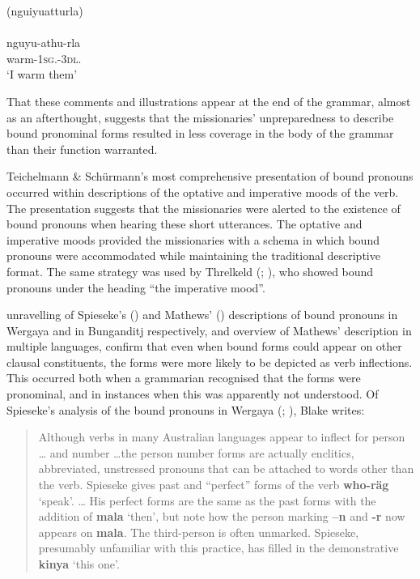 \ea\label{ex:5:18}
(nguiyuatturla)	\\
\citep[23]{teichelmann_outlines_1840} \\
\gll nguyu-athu-rla \\
warm-1\textsc{sg}.-3\textsc{dl}.                              \\
\glt `I warm them'
\z

That these comments and illustrations appear at the end of the grammar, almost as an afterthought, suggests that the missionaries' unpreparedness to describe bound pronominal forms resulted in less coverage in the body of the grammar than their function warranted. 

Teichelmann \& Schürmann’s most comprehensive presentation of bound pronouns occurred within descriptions of the optative and imperative moods of the verb. The presentation suggests that the missionaries were alerted to the existence of bound pronouns when hearing these short utterances. The optative and imperative moods provided the missionaries with a schema in which bound pronouns were accommodated while maintaining the traditional descriptive format. The same strategy was used by Threlkeld (\citeyear[51]{threlkeld_australian_1834}; ), who showed bound pronouns under the heading ``the imperative mood''.

 unravelling of Spieseke’s (\citeyear{spieseke1878}) and Mathews' (\citeyear{mathews_language_1903}) descriptions of bound pronouns in Wergaya and in Bunganditj respectively, and  overview of Mathews' description in multiple languages, confirm that even when bound forms could appear on other clausal constituents, the forms were more likely to be depicted as verb inflections. This occurred both when a grammarian recognised that the forms were pronominal, and in instances when this was apparently not understood. Of Spieseke’s analysis of the bound pronouns in Wergaya (\citealt{spieseke1878}; ), Blake writes:

\begin{quote}
    Although verbs in many Australian languages appear to inflect for person … and number …the person number forms are actually enclitics, abbreviated, unstressed pronouns that can be attached to words other than the verb. Spieseke gives past and “perfect” forms of the verb \textbf{who-räg} `speak'. … His perfect forms are the same as the past forms with the addition of \textbf{mala} `then', but note how the person marking \textbf{–n} and \textbf{-r} now appears on \textbf{mala}. The third-person is often unmarked. Spieseke, presumably unfamiliar with this practice, has filled in the demonstrative \textbf{kinya} `this one'. \citep[18--19]{blake_nineteenth-century_2015}
\end{quote}
 
